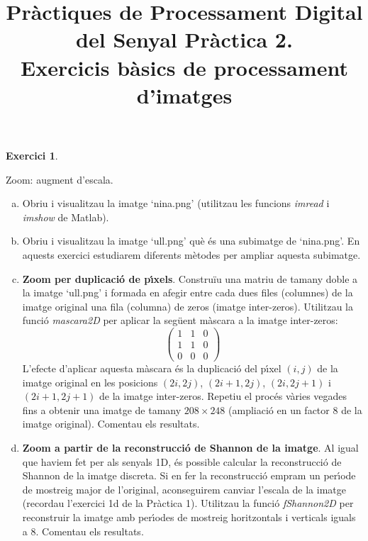 \documentclass{article}
\title{Pr\`actiques de Processament Digital del
Senyal\newline\newline
Pr\`actica 2. \\
Exercicis b\`asics de processament d'imatges }
\date{}
\begin{document}
\maketitle

\noindent \textbf{Exercici 1}.\label{ex1}
\newline

Zoom: augment d'escala.
\begin{enumerate}[a)]
\item \label{1a} Obriu i visualitzau la imatge `nina.png'
(utilitzau les funcions {\it imread} i {\it imshow} de Matlab).

\item \label{1b} Obriu i visualitzau la imatge `ull.png' qu\`e
\'es una subimatge de `nina.png'. En aquests exercici estudiarem
diferents m\`etodes per ampliar aquesta subimatge.

\item \label{1c} {\bf Zoom per duplicaci\'o de p\'\i xels}.
Constru\"iu una matriu de tamany doble a la imatge `ull.png' i
formada en afegir entre cada dues files (columnes) de la imatge
original una fila (columna) de zeros (imatge inter-zeros).
Utilitzau la funci\'o {\it mascara2D} per aplicar la seg\"uent
m\`ascara a la imatge inter-zeros:
$$
\left( \begin{array}{ccc} 1 & 1 & 0\\1 & 1 & 0\\0 & 0 &
0\end{array} \right)
$$
\noindent L'efecte d'aplicar aquesta m\`ascara \'es la
duplicaci\'o del p\'\i xel $(i,j)$ de la imatge original en les
posicions $(2i,2j)$, $(2i+1,2j)$, $(2i,2j+1)$ i $(2i+1,2j+1)$ de
la imatge inter-zeros.
\newline
Repetiu el proc\'es v\`aries vegades fins a obtenir una imatge de
tamany $208 \times 248$ (ampliaci\'o en un factor $8$ de la imatge
original). Comentau els resultats.

\item \label{1d} {\bf Zoom a partir de la reconstrucci\'o de
Shannon de la imatge}. Al igual que haviem fet per als senyals 1D,
\'es possible calcular la reconstrucci\'o de Shannon de la imatge
discreta. Si en fer la reconstrucci\'o empram un per\'\i ode de
mostreig major de l'original, aconseguirem canviar l'escala de la
imatge (recordau l'exercici 1d de la Pr\`actica 1).\newline
Utilitzau la funci\'o {\it fShannon2D} per reconstruir la imatge
amb per\'\i odes de mostreig horitzontals i verticals iguals a
$8$. Comentau els resultats.


\end{enumerate}
\end{document}
